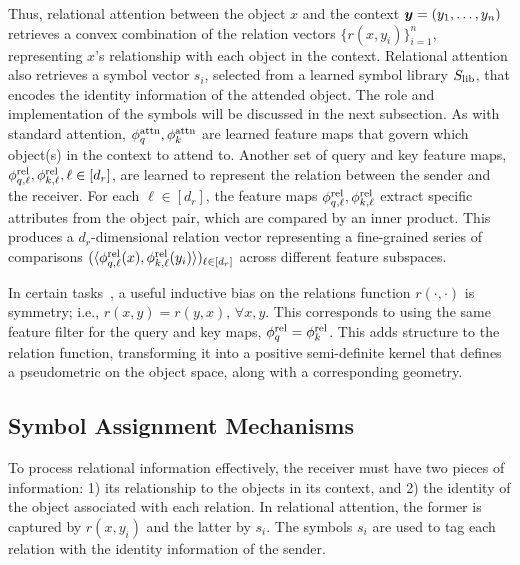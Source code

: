 
Thus, relational attention between the object $x$ and the context $\bm{y} = (y_1, \ldots, y_n)$ retrieves a convex combination of the relation vectors $\{r(x, y_i)\}_{i=1}^{n}$, representing $x$'s relationship with each object in the context. Relational attention also retrieves a symbol vector $s_i$, selected from a learned symbol library $S_\mathrm{lib}$, that encodes the identity information of the attended object. The role and implementation of the symbols will be discussed in the next subsection. As with standard attention, $\phi_q^{\mathrm{attn}}, \phi_k^{\mathrm{attn}}$ are learned feature maps that govern which object(s) in the context to attend to. Another set of query and key feature maps, $\phi_{q, \ell}^{\mathrm{rel}}, \phi_{k, \ell}^{\mathrm{rel}}, \ell \in [d_r]$, are learned to represent the relation between the sender and the receiver. For each $\ell \in [d_r]$, the feature maps $\phi_{q, \ell}^{\mathrm{rel}}, \phi_{k, \ell}^{\mathrm{rel}}$ extract specific attributes from the object pair, which are compared by an inner product. This produces a $d_r$-dimensional relation vector representing a fine-grained series of comparisons $(\langle \phi_{q, \ell}^{\mathrm{rel}}(x), \phi_{k, \ell}^{\mathrm{rel}}(y_i) \rangle)_{\ell \in [d_r]}$ across different feature subspaces.

In certain tasks~\citep{kergNeuralArchitectureInductive2022,altabaa2024abstractors,altabaaLearningHierarchicalRelational2024}, a useful inductive bias on the relations function $r(\cdot, \cdot)$ is symmetry; i.e., $r(x, y) = r(y, x),\, \forall x, y$. This corresponds to using the same feature filter for the query and key maps, $\phi_q^{\mathrm{rel}} = \phi_k^{\mathrm{rel}}$. This adds structure to the relation function, transforming it into a positive semi-definite kernel that defines a pseudometric on the object space, along with a corresponding geometry. %

\subsection{Symbol Assignment Mechanisms}

To process relational information effectively, the receiver must have two pieces of information: 1) its relationship to the objects in its context, and 2) the identity of the object associated with each relation. In relational attention, the former is captured by $r(x, y_i)$ and the latter by $s_i$.
The symbols $s_i$ are used to tag each relation with the identity information of the sender. %

